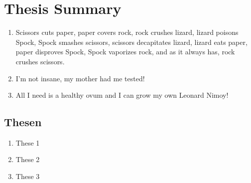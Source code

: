 \chapter*{Thesis Summary}
\thispagestyle{empty}

\begin{enumerate}

\item Scissors cuts paper, paper covers rock, rock crushes lizard, lizard poisons Spock, Spock smashes scissors, scissors decapitates lizard, lizard eats paper, paper disproves Spock, Spock vaporizes rock, and as it always has, rock crushes scissors.

\item I'm not insane, my mother had me tested!

\item All I need is a healthy ovum and I can grow my own Leonard Nimoy!

\end{enumerate}
\newpage
\section*{Thesen}
\thispagestyle{empty}
\begin{enumerate}
\item These 1
\item These 2
\item These 3

\end{enumerate}